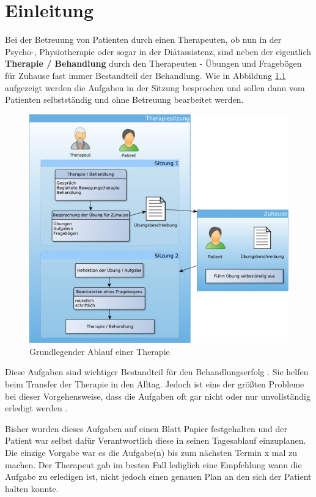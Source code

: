 \chapter{Einleitung}
Bei der Betreuung von Patienten durch einen Therapeuten, ob nun in der Psycho-, Physiotherapie oder sogar in der Diätassistenz, sind neben der eigentlich \textbf{Therapie / Behandlung} durch den Therapeuten - Übungen und Fragebögen für Zuhause fast immer Bestandteil der Behandlung. Wie in Abbildung \ref{TherapieAblauf} aufgezeigt werden die Aufgaben in der Sitzung besprochen und sollen dann vom Patienten selbstständig und ohne Betreuung bearbeitet werden.

\begin{figure}[H]
	\centering
	\includegraphics[scale=0.55]{images/TherapieAblauf}
	\caption[Grundlegender Ablauf einer Therapie]{Grundlegender Ablauf einer Therapie}
	\label{TherapieAblauf}
\end{figure}

Diese Aufgaben sind wichtiger Bestandteil für den Behandlungserfolg \cite{SL05}. Sie helfen beim Transfer der Therapie in den Alltag. Jedoch ist eins der größten Probleme bei dieser Vorgehensweise, dass die Aufgaben oft gar nicht oder nur unvollständig erledigt werden \cite{FF01}.

Bisher wurden dieses Aufgaben auf einen Blatt Papier festgehalten und der Patient war selbst dafür Verantwortlich diese in seinen Tagesablauf einzuplanen. Die einzige Vorgabe war es die Aufgabe(n) bis zum nächsten Termin x mal zu machen. Der Therapeut gab im besten Fall lediglich eine Empfehlung wann die Aufgabe zu erledigen ist, nicht jedoch einen genauen Plan an den sich der Patient halten konnte.
